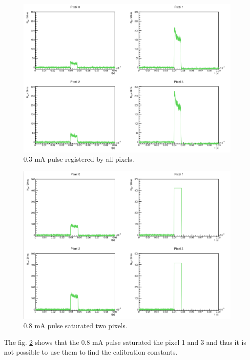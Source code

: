 \begin{figure}[H]
 \centering
 \includegraphics[scale=0.35, angle = 0]{./pictures/CalibPulses.png}
 \caption{0.3 mA pulse registered by all pixels.}
 \label{03pulse}
 
\end{figure}

\begin{figure}[H]
 \centering
 \includegraphics[scale=0.35, angle = 0]{./pictures/CalibSaturated.png}
 \caption{0.8 mA pulse saturated two pixels.}
 \label{08pulse}
 
\end{figure}


The fig. \ref{08pulse} shows that the 0.8 mA pulse saturated the pixel 1 and 3 and thus it is not possible to use them to find the calibration constants. 


